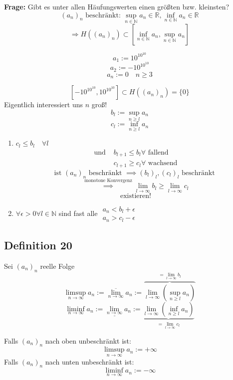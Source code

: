 \documentclass[fleqn]{scrbook}
\newcommand{\R}{\mathbb{R}}
\newcommand{\N}{\mathbb{N}}
\newenvironment{example}{{\bfseries Beispiel }}{}
\begin{document}
\textbf{Frage:} Gibt es unter allen Häufungswerten einen größten bzw. kleinsten?
\[(a_n)_n \text{ beschränkt: } \sup_{n \in \N} a_n \in \R, \inf_{n \in \N} a_n \in \R \]
\[\Longrightarrow H((a_n)_n) \subset \left[\inf_{n \in \N} a_n,\sup_{n \in \N} a_n \right] \]

\begin{example}
\[a_1:= 10^{10^{10}}\]
\[a_2:= -10^{10^{10}}\]
\[a_n:= 0 \quad n\geq 3\]

\[\left[ -10^{10^{10}}, 10^{10^{10}} \right] \subset H((a_n)_n)=\{0\}\]
Eigentlich interessiert uns $n$ groß!
\end{example}
\[ b_l := \sup_{n \geq l} a_n \]
\[ c_l := \inf_{n \geq l} a_n \]

\begin{enumerate}
 \item $\boxed{c_l \leq b_l \quad \forall l} $
   \[
     \begin{array}{ll}
       \text{und } & b_{l+1} \leq b_l \forall \text{ fallend} \\
                    & c_{l+1} \geq c_l \forall \text{ wachsend} 
     \end{array}
   \]
   \[\text{ist } (a_n)_n \text{ beschränkt } \implies (b_l)_l, (c_l)_l \text{ beschränkt }\]
   \[\stackrel{\text{monotone Konvergenz}}{\implies} \lim_{l\to \infty} b_l \geq \lim_{l \to \infty} c_l\]
   \[\text{existieren!}\]
 \item $ \forall \epsilon > 0 \forall l \in \N $ sind fast alle $\begin{array}{c}a_n<b_l+\epsilon \\ a_n > c_l -\epsilon \end{array}$
\end{enumerate}

\subsection{Definition 20}

Sei $(a_n)_n$ reelle Folge 
\[\limsup_{n \to \infty} a_n:= \overline{\lim_{n \to \infty}} a_n:= \overbrace{\lim_{l \to \infty} \left(\sup_{n \geq l} a_n\right)}^{=\lim_{l \to \infty} b_l}\]
\[\liminf_{n \to \infty} a_n:= \underline{\lim_{n \to \infty}} a_n:= \underbrace{\lim_{l \to \infty} \left(\inf_{n \geq l} a_n\right)}_{=\lim_{l \to \infty} c_l}\]

Falls $(a_n)_n$ nach oben unbeschränkt ist:
\[\limsup_{n \to \infty} a_n:= +\infty\]
Falls $(a_n)_n$ nach unten unbeschränkt ist:
\[\liminf_{n \to \infty} a_n:= -\infty\]
\end{document}
